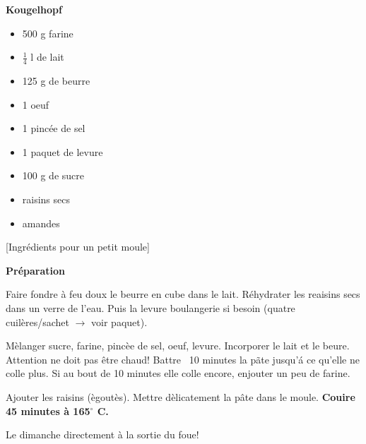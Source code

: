 

\parindent0pt	

\pagestyle{empty}


\textbf{{\LARGE Kougelhopf}}%

\hrulefill
\vspace*{\fill}
\begin{multicols}{2}	


\begin{itemize}
\item 500 g farine
\item $\frac{1}{4}$ l de lait
\item 125 g de beurre
\item 1 oeuf
\item 1 pinc\'{e}e de sel
\item 1 paquet de levure
\item 100 g de sucre
\item raisins secs
\item amandes
\end{itemize}
\end{multicols}
\vfill									%

\vspace{2cm}
%
\begin{center}
%
[Ingr\'{e}dients pour un petit moule]%
\end{center}


\vfill
\newpage
\textbf{{\LARGE Pr\'{e}paration}}%

\hrulefill

\vspace*{\fill}
\begin{multicols}{2}


Faire fondre à feu doux le beurre en cube dans le lait.\newline
Réhydrater les reaisins secs dans un verre de l'eau.
Puis la levure boulangerie si besoin (quatre cuilères/sachet $\rightarrow$ voir paquet).\newline

Mèlanger sucre, farine, pincèe de sel, oeuf, levure.
Incorporer le lait et le beure. \newline
Attention ne doit pas \^{e}tre chaud!\newline
Battre ~10 minutes la p\~{a}te jusqu'á ce qu'elle ne colle plus. 
Si au bout de 10 minutes elle colle encore, enjouter un peu de farine.\newline

Ajouter les raisins (ègoutès).
Mettre dèlicatement la p\^{a}te dans le moule.
\textbf{Couire 45 minutes à 165$^\circ$ C.}\newline

Le dimanche directement à la sortie du foue!


\end{multicols}
\vfill
